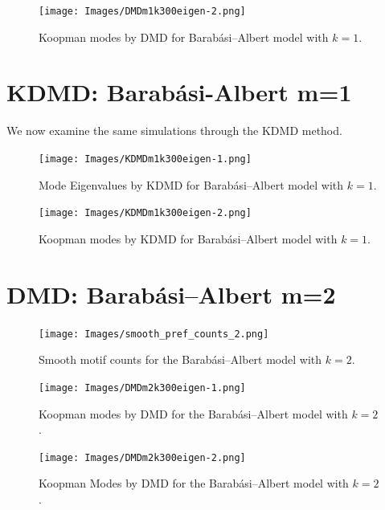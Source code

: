\begin{figure}
    \texttt{[image: Images/DMDm1k300eigen-2.png]}
    \centering
    \caption{Koopman modes by DMD for Barabási–Albert model
    with $k=1$.}
\end{figure}

\clearpage

\section{KDMD: Barabási-Albert m=1}

We now examine the same simulations through the KDMD method.

\FloatBarrier

\begin{figure}
    \texttt{[image: Images/KDMDm1k300eigen-1.png]}
    \centering
    \caption{Mode Eigenvalues by KDMD for Barabási–Albert model
    with $k=1$.}
\end{figure}

\begin{figure}
    \texttt{[image: Images/KDMDm1k300eigen-2.png]}
    \centering
    \caption{Koopman modes by KDMD for Barabási–Albert model
    with $k=1$.}
\end{figure}

\clearpage

\FloatBarrier

\section{DMD: Barabási–Albert m=2}

\begin{figure}
    \texttt{[image: Images/smooth\_pref\_counts\_2.png]}
    \centering
    \caption{Smooth motif counts for the Barabási–Albert model with $k=2$.}
\end{figure}

\clearpage
\begin{figure}
    \texttt{[image: Images/DMDm2k300eigen-1.png]}
    \centering
    \caption{Koopman modes by DMD for the Barabási–Albert model
    with $k=2$.}
\end{figure}

\begin{figure}
    \texttt{[image: Images/DMDm2k300eigen-2.png]}
    \centering
    \caption{Koopman Modes by DMD for the Barabási–Albert model
    with $k=2$.}
\end{figure}

\clearpage

